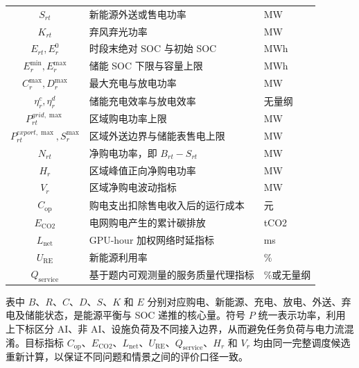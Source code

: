 \begin{table}[htbp]
\begin{tabular}{cll}
$S_{rt}$ & 新能源外送或售电功率 & MW \\
$K_{rt}$ & 弃风弃光功率 & MW \\
$E_{rt},E_r^0$ & 时段末绝对 SOC 与初始 SOC & MWh \\
$E_r^{\min},E_r^{\max}$ & 储能 SOC 下限与容量上限 & MWh \\
$C_r^{\max},D_r^{\max}$ & 最大充电与放电功率 & MW \\
$\eta_r^c,\eta_r^d$ & 储能充电效率与放电效率 & 无量纲 \\
$P_{rt}^{grid,\max}$ & 区域购电功率上限 & MW \\
$P_{rt}^{export,\max},S_r^{\max}$ & 区域外送边界与储能表售电上限 & MW \\
$N_{rt}$ & 净购电功率，即 $B_{rt}-S_{rt}$ & MW \\
$H_r$ & 区域峰值正向净购电功率 & MW \\
$V_r$ & 区域净购电波动指标 & MW \\
$C_{\mathrm{op}}$ & 购电支出扣除售电收入后的运行成本 & 元 \\
$E_{\mathrm{CO2}}$ & 电网购电产生的累计碳排放 & tCO2 \\
$L_{\mathrm{net}}$ & GPU-hour 加权网络时延指标 & ms \\
$U_{\mathrm{RE}}$ & 新能源利用率 & \% \\
$Q_{\mathrm{service}}$ & 基于题内可观测量的服务质量代理指标 & \%或无量纲 \\
\bottomrule
\end{tabular}
\end{table}

表中 $B$、$R$、$C$、$D$、$S$、$K$ 和 $E$ 分别对应购电、新能源、充电、放电、外送、弃电及储能状态，是能源平衡与 SOC 递推的核心量。符号 $P$ 统一表示功率，利用上下标区分 AI、非 AI、设施负荷及不同接入边界，从而避免任务负荷与电力流混淆。目标指标 $C_{\mathrm{op}}$、$E_{\mathrm{CO2}}$、$L_{\mathrm{net}}$、$U_{\mathrm{RE}}$、$Q_{\mathrm{service}}$、$H_r$ 和 $V_r$ 均由同一完整调度候选重新计算，以保证不同问题和情景之间的评价口径一致。
